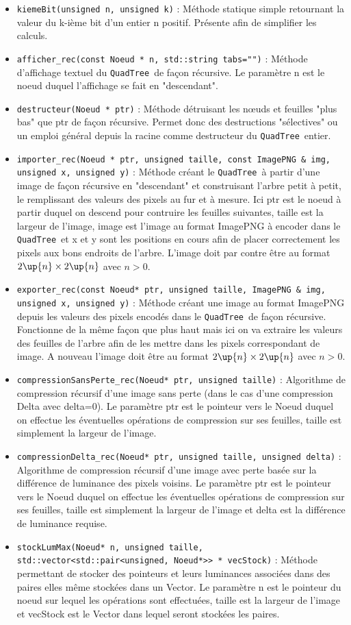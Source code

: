 \documentclass{article}
\newcommand{\info}{\texttt}
\newcommand{\qt}{\info{QuadTree}}
\begin{document}
	\begin{itemize}
		\item \info{kiemeBit(unsigned n, unsigned k)} : Méthode statique simple retournant la valeur du k-ième bit d'un entier n positif. Présente afin de simplifier les calculs.
		\item \info{afficher\_rec(const Noeud * n, std::string tabs="")} : Méthode d'affichage textuel du \qt\ de façon récursive. Le paramètre n est le noeud duquel l'affichage se fait en "descendant".
		\item \info{destructeur(Noeud * ptr)} : Méthode détruisant les nœuds et feuilles "plus bas" que ptr de façon récursive. Permet donc des destructions "sélectives" ou un emploi général depuis la racine comme destructeur du \qt\ entier.
		\item \info{importer\_rec(Noeud * ptr, unsigned taille, const ImagePNG \& img, unsigned x, unsigned y)} : Méthode créant le \qt\ à partir d'une image de façon récursive en "descendant" et construisant l'arbre petit à petit, le remplissant des valeurs des pixels au fur et à mesure. Ici ptr est le noeud à partir duquel on descend pour contruire les feuilles suivantes, taille est la largeur de l'image, image est l'image au format ImagePNG à encoder dans le \qt\ et x et y sont les positions en cours afin de placer correctement les pixels aux bons endroits de l'arbre. L'image doit par contre être au format $2\up{n}\times2\up{n}$ avec $n>0$.
		\item \info{exporter\_rec(const Noeud* ptr, unsigned taille, ImagePNG \& img, unsigned x, unsigned y)} : Méthode créant une image au format ImagePNG depuis les valeurs des pixels encodés dans le \qt\ de façon récursive. Fonctionne de la même façon que plus haut mais ici on va extraire les valeurs des feuilles de l'arbre afin de les mettre dans les pixels correspondant de image. A nouveau l'image doit être au format $2\up{n}\times2\up{n}$ avec $n>0$.
		\item \info{compressionSansPerte\_rec(Noeud* ptr, unsigned taille)} : Algorithme de compression récursif d'une image sans perte (dans le cas d'une compression Delta avec delta=0). Le paramètre ptr est le pointeur vers le Noeud duquel on effectue les éventuelles opérations de compression sur ses feuilles, taille est simplement la largeur de l'image.
		\item \info{compressionDelta\_rec(Noeud* ptr, unsigned taille, unsigned delta)} : Algorithme de compression récursif d'une image avec perte basée sur la différence de luminance des pixels voisins. Le paramètre ptr est le pointeur vers le Noeud duquel on effectue les éventuelles opérations de compression sur ses feuilles, taille est simplement la largeur de l'image et delta est la différence de luminance requise.
		\item \info{stockLumMax(Noeud* n, unsigned taille, std::vector<std::pair<unsigned, Noeud*>> * vecStock)} : Méthode permettant de stocker des pointeurs et leurs luminances associées dans des paires elles même stockées dans un Vector. Le paramètre n est le pointeur du noeud sur lequel les opérations sont effectuées, taille est la largeur de l'image et vecStock est le Vector dans lequel seront stockées les paires.
	\end{itemize}
	
\end{document}
